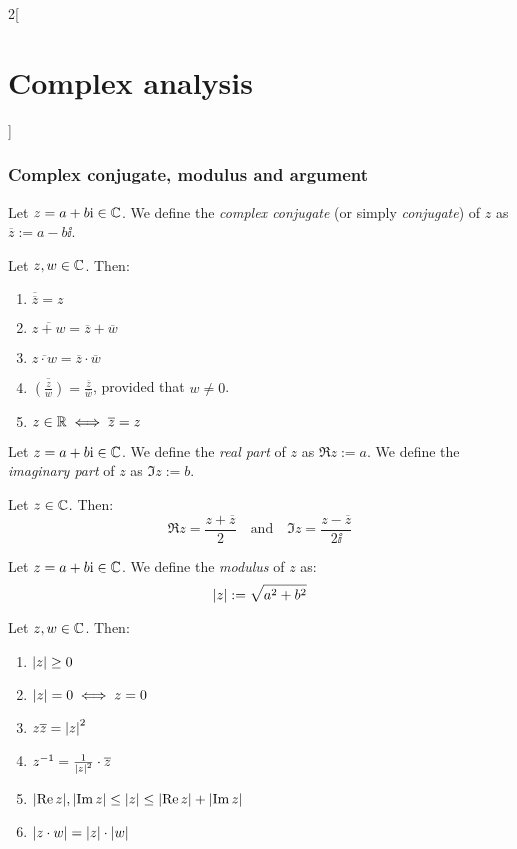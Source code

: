 \documentclass[../../../main.tex]{subfiles}
\begin{document}
\begin{multicols}{2}[\section{Complex analysis}]
  \subsubsection{Complex conjugate, modulus and argument}
  \begin{definition}
    Let $z=a+b\mathrm{i}\in\mathbb{C}$. We define the \emph{complex conjugate} (or simply \emph{conjugate}) of $z$ as $\overline{z}:=a-b\ii$.
  \end{definition}
  \begin{proposition}
    Let $z,w\in\mathbb{C}$. Then:
    \begin{enumerate}
      \item $\overline{\overline{z}}=z$
      \item $\overline{z+w}=\overline{z}+\overline{w}$
      \item $\overline{z\cdot w}=\overline{z}\cdot\overline{w}$
      \item $\displaystyle\overline{\left(\frac{z}{w}\right)}=\frac{\overline{z}}{\overline{w}}$, provided that $w\ne 0$.
      \item $z\in\mathbb{R}\iff \overline{z}=z$
    \end{enumerate}
  \end{proposition}
  \begin{definition}
    Let $z=a+b\mathrm{i}\in\mathbb{C}$. We define the \emph{real part} of $z$ as $\Re z:=a$. We define the \emph{imaginary part} of $z$ as $\Im z:=b$.
  \end{definition}
  \begin{proposition}
    Let $z\in\mathbb{C}$. Then: $$\Re z=\frac{z+\overline{z}}{2}\quad\text{and}\quad\Im z=\frac{z-\overline{z}}{2\ii}$$
  \end{proposition}
  \begin{definition}
    Let $z=a+b\mathrm{i}\in\mathbb{C}$. We define the \emph{modulus} of $z$ as: $$\abs{z}:=\sqrt{a^2+b^2}$$
  \end{definition}
  \begin{proposition}
    Let $z,w\in\mathbb{C}$. Then:
    \begin{enumerate}
      \item $\abs{z}\geq 0$
      \item $\abs{z}=0\iff z=0$
      \item $z\overline{z}={\abs{z}}^2$
      \item $z^{-1}=\frac{1}{{\abs{z}}^2}\cdot\overline{z}$
      \item $\abs{\Re z},\abs{\Im z}\leq \abs{z}\leq\abs{\Re z}+\abs{\Im z}$
      \item $\abs{z\cdot w}=\abs{z}\cdot \abs{w}$

\end{enumerate}
\end{proposition}
\end{multicols}
\end{document}
